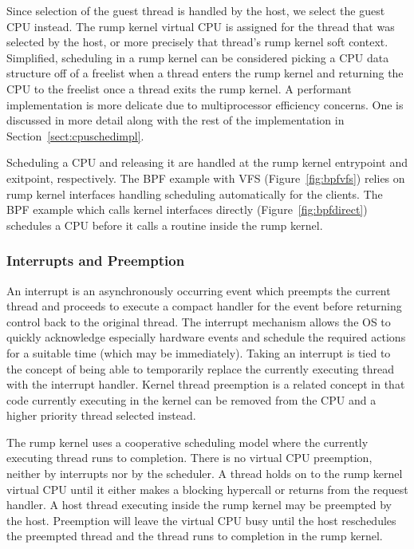 Since selection of the guest thread is handled by the host, we select the
guest CPU instead.  The rump kernel virtual CPU is assigned for the thread
that was selected by the host, or more precisely that thread's rump kernel
soft context.  Simplified, scheduling in a rump kernel can be considered
picking a CPU data structure off of a freelist when a thread enters the
rump kernel and returning the CPU to the freelist once a thread exits
the rump kernel.  A performant implementation is more delicate due to
multiprocessor efficiency concerns.  One is discussed in more detail along
with the rest of the implementation in Section~\ref{sect:cpuschedimpl}.

Scheduling a CPU and releasing it are handled at the rump kernel
entrypoint and exitpoint, respectively.  The BPF example with VFS
(Figure~\ref{fig:bpfvfs}) relies on rump kernel interfaces handling
scheduling automatically for the clients.  The BPF example which calls
kernel interfaces directly (Figure~\ref{fig:bpfdirect}) schedules a CPU
before it calls a routine inside the rump kernel.

\subsubsection{Interrupts and Preemption}
\label{sect:preempt}

An interrupt is an asynchronously occurring event which preempts
the current thread and proceeds to execute a compact handler for
the event before returning control back to the original thread.
The interrupt mechanism allows the OS to quickly acknowledge especially
hardware events and schedule the required actions for a suitable time
(which may be immediately).  Taking an interrupt is tied to the concept
of being able to temporarily replace the currently executing thread with
the interrupt handler.  Kernel thread preemption is a related concept
in that code currently executing in the kernel can be removed from
the CPU and a higher priority thread selected instead.

The rump kernel uses a cooperative scheduling model where the
currently executing thread runs to completion.  There is no virtual CPU
preemption, neither by interrupts nor by the scheduler.  A thread holds
on to the rump kernel virtual CPU until it either makes a blocking
hypercall or returns from the request handler.  A host thread
executing inside the rump kernel may be preempted by the host.  Preemption
will leave the virtual CPU busy until the host reschedules the preempted
thread and the thread runs to completion in the rump kernel.

